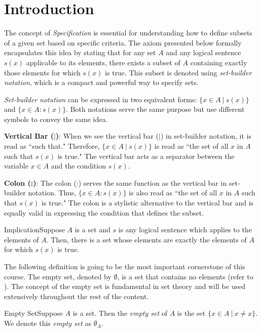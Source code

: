 \renewcommand{\theenumi}{\arabic{enumi}}
\renewcommand{\labelenumi}{\theenumi.}
\section{Introduction}
 
 The concept of \textit{Specification} is essential for understanding how to define subsets of a given set based on specific criteria. The axiom presented below formally encapsulates this idea by stating that for any set \(A\) and any logical sentence \(s(x)\) applicable to its elements, there exists a subset of \(A\) containing exactly those elements for which \(s(x)\) is true. This subset is denoted using \textit{set-builder notation}, which is a compact and powerful way to specify sets.

\textit{Set-builder notation} can be expressed in two equivalent forms: \(\{x \in A \ | \ s(x)\}\) and \(\{x \in A \colon s(x)\}\). Both notations serve the same purpose but use different symbols to convey the same idea.

    \textbf{Vertical Bar (\(|\))}: When we see the vertical bar (\(|\)) in set-builder notation, it is read as ``such that." Therefore, \(\{x \in A \ | \ s(x)\}\) is read as ``the set of all \(x\) in \(A\) such that \(s(x)\) is true." The vertical bar acts as a separator between the variable \(x \in A\) and the condition \(s(x)\).

    \textbf{Colon (:)}: The colon (:) serves the same function as the vertical bar in set-builder notation. Thus, \(\{x \in A \colon s(x)\}\) is also read as ``the set of all \(x\) in \(A\) such that \(s(x)\) is true." The colon is a stylistic alternative to the vertical bar and is equally valid in expressing the condition that defines the subset.

\begin{axiom}
    {Implication}Suppose \(A\) is a set and \(s\) is any logical sentence which applies to the elements of \(A\). Then, there is a set whose elements are exactly the elements of \(A\) for which \(s(x)\) is true.
\end{axiom}

The following definition is going to be the most important cornerstone of this course. The empty set, denoted by \(\emptyset\), is a set that contains no elements (refer to ). The concept of the empty set is fundamental in set theory and will be used extensively throughout the rest of the content.
    
\begin{definition}
    {Empty Set}Suppose \(A\) is a set. Then the \textit{empty set} of \(A\) is the set \(\{x\in A \ | \ x\ne x\}\). We denote this \textit{empty set} as \(\emptyset_A\).
\end{definition}


